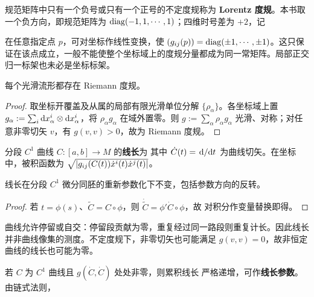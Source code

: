 \begin{definition}
    规范矩阵中只有一个负号或只有一个正号的不定度规称为 \textbf{Lorentz 度规}。本书取一个负方向，即规范矩阵为 $\operatorname{diag}(-1,1,\cdots,1)$；四维时号差为 $+2$，记
\end{definition}

\begin{remark}
    在任意指定点 $p$，可对坐标作线性变换，使 $(g_{ij}(p))=\operatorname{diag}(\pm1,\cdots,\pm1)$。这只保证在该点成立，一般不能使整个坐标域上的度规分量都成为同一常矩阵。局部正交归一标架也未必是坐标标架。
\end{remark}

\begin{theorem}
    每个光滑流形都存在 Riemann 度规。
\end{theorem}
\begin{proof}
    取坐标开覆盖及从属的局部有限光滑单位分解 $\{\rho_\alpha\}$。各坐标域上置 $g_\alpha:=\sum_i\dd x_\alpha^i\otimes\dd x_\alpha^i$，将 $\rho_\alpha g_\alpha$ 在域外置零。则 $g:=\sum_\alpha\rho_\alpha g_\alpha$ 光滑、对称；对任意非零切矢 $v$，有 $g(v,v)>0$，故为 Riemann 度规。
\end{proof}

\begin{definition}
    分段 $C^1$ 曲线 $C:[a,b]\to M$ 的\textbf{线长}为
    其中 $\dot C(t)=\dv*{}{t}$ 为曲线切矢。在坐标中，被积函数为 $\sqrt{\abs{g_{ij}(C(t))\dot x^i(t)\dot x^j(t)}}$。
\end{definition}

\begin{theorem}
    线长在分段 $C^1$ 微分同胚的重新参数化下不变，包括参数方向的反转。
\end{theorem}
\begin{proof}
    若 $t=\phi(s)$、$\widetilde C=C\circ\phi$，则 $\dot{\widetilde C}=\phi'\dot C\circ\phi$，故
    对积分作变量替换即得。
\end{proof}

\begin{remark}
    曲线允许停留或自交：停留段贡献为零，重复经过同一路段则重复计长。因此线长并非曲线像集的测度。不定度规下，非零切矢也可能满足 $g(v,v)=0$，故非恒定曲线的线长也可能为零。
\end{remark}

若 $C$ 为 $C^1$ 曲线且 $g(\dot C,\dot C)$ 处处非零，则累积线长
严格递增，可作\textbf{线长参数}。由链式法则，

